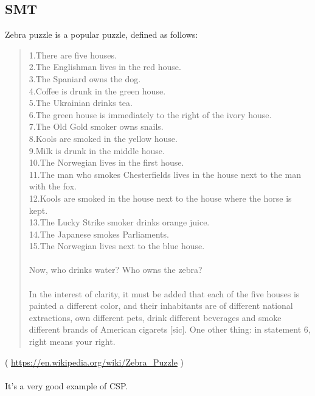 \subsection{SMT}
\label{zebra_SMT}

Zebra puzzle is a popular puzzle, defined as follows:

\begin{framed}
\begin{quotation}
1.There are five houses.\\
2.The Englishman lives in the red house.\\
3.The Spaniard owns the dog.\\
4.Coffee is drunk in the green house.\\
5.The Ukrainian drinks tea.\\
6.The green house is immediately to the right of the ivory house.\\
7.The Old Gold smoker owns snails.\\
8.Kools are smoked in the yellow house.\\
9.Milk is drunk in the middle house.\\
10.The Norwegian lives in the first house.\\
11.The man who smokes Chesterfields lives in the house next to the man with the fox.\\
12.Kools are smoked in the house next to the house where the horse is kept.\\
13.The Lucky Strike smoker drinks orange juice.\\
14.The Japanese smokes Parliaments.\\
15.The Norwegian lives next to the blue house.\\
\\
Now, who drinks water? Who owns the zebra?\\
\\
In the interest of clarity, it must be added that each of the five houses is painted a different color, and their inhabitants are of different national extractions, own different pets, drink different beverages and smoke different brands of American cigarets [sic]. One other thing: in statement 6, right means your right.
\end{quotation}
\end{framed}
( \url{https://en.wikipedia.org/wiki/Zebra_Puzzle} ) \\
\\
It's a very good example of \ac{CSP}.

